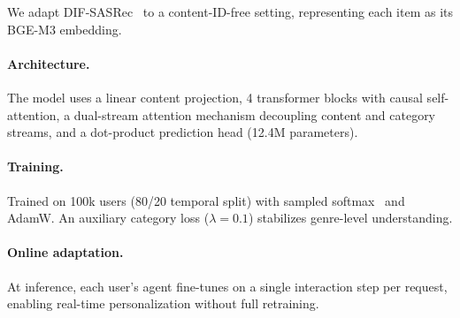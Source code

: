 We adapt DIF-SASRec~\cite{xie2022difsr} to a content-ID-free setting,
representing each item as its BGE-M3 embedding.

\paragraph{Architecture.}
The model uses a linear content projection, 4 transformer blocks with
causal self-attention, a dual-stream attention mechanism decoupling content
and category streams, and a dot-product prediction head (12.4M parameters).

\paragraph{Training.}
Trained on 100k users (80/20 temporal split) with sampled
softmax~\cite{jean2015using} and AdamW. An auxiliary category loss
($\lambda = 0.1$) stabilizes genre-level understanding.

\paragraph{Online adaptation.}
At inference, each user's agent fine-tunes on a single interaction step per
request, enabling real-time personalization without full retraining.
